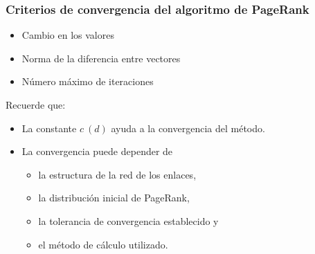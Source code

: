 \documentclass[
10pt, %
aspectratio=169, %
]{beamer}
\begin{document}
	\begin{frame}
		
		\frametitle{Criterios de convergencia del algoritmo de PageRank}
		
		
		\begin{itemize}
			
			\item Cambio en los valores 
			
			\item Norma de la diferencia entre vectores 
			
			\item Número máximo de iteraciones
			
		\end{itemize}
		
		\pause
		\vspace{2\baselineskip}
		
		Recuerde que: 
		\begin{itemize}
			\item La constante $c\ (d)$ ayuda a la convergencia del método.
			
			\item La convergencia puede depender de
			\begin{itemize}
				\item la estructura de la red de los enlaces,
				\item la distribución inicial de PageRank,
				\item la tolerancia de convergencia establecido y 
				\item el método de cálculo utilizado.
			\end{itemize}
			
		\end{itemize}
		
	\end{frame}
	
\end{document}
